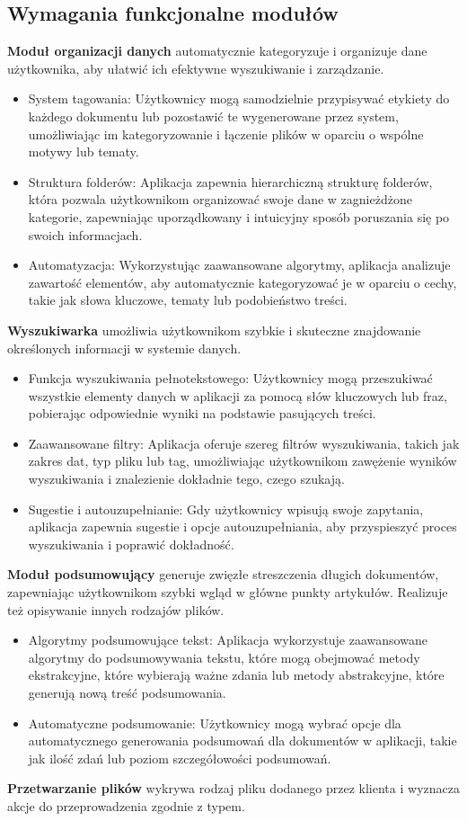 \documentclass[12pt,a4paper,twoside]{article}
\begin{document}
\subsection{Wymagania funkcjonalne modułów}
\textbf{Moduł organizacji danych} automatycznie kategoryzuje i organizuje dane użytkownika, aby ułatwić ich efektywne wyszukiwanie i zarządzanie.
\begin{itemize}
	\item System tagowania: Użytkownicy mogą samodzielnie przypisywać etykiety do każdego dokumentu lub pozostawić te wygenerowane przez system, umożliwiając im kategoryzowanie i łączenie plików w oparciu o wspólne motywy lub tematy.
	\item Struktura folderów: Aplikacja zapewnia hierarchiczną strukturę folderów, która pozwala użytkownikom organizować swoje dane w zagnieżdżone kategorie, zapewniając uporządkowany i intuicyjny sposób poruszania się po swoich informacjach.
	\item Automatyzacja: Wykorzystując zaawansowane algorytmy, aplikacja analizuje zawartość elementów, aby automatycznie kategoryzować je w oparciu o cechy, takie jak słowa kluczowe, tematy lub podobieństwo treści.
\end{itemize}\par
\textbf{Wyszukiwarka} umożliwia użytkownikom szybkie i skuteczne znajdowanie określonych informacji w systemie danych.
\begin{itemize}
	\item Funkcja wyszukiwania pełnotekstowego: Użytkownicy mogą przeszukiwać wszystkie elementy danych w aplikacji za pomocą słów kluczowych lub fraz, pobierając odpowiednie wyniki na podstawie pasujących treści.
	\item Zaawansowane filtry: Aplikacja oferuje szereg filtrów wyszukiwania, takich jak zakres dat, typ pliku lub tag, umożliwiając użytkownikom zawężenie wyników wyszukiwania i znalezienie dokładnie tego, czego szukają.
	\item Sugestie i autouzupełnianie: Gdy użytkownicy wpisują swoje zapytania, aplikacja zapewnia sugestie i opcje autouzupełniania, aby przyspieszyć proces wyszukiwania i poprawić dokładność.
\end{itemize}\par
\textbf{Moduł podsumowujący} generuje zwięzłe streszczenia długich dokumentów, zapewniając użytkownikom szybki wgląd w główne punkty artykułów. Realizuje też opisywanie innych rodzajów plików.
\begin{itemize}
	\item Algorytmy podsumowujące tekst: Aplikacja wykorzystuje zaawansowane algorytmy do podsumowywania tekstu, które mogą obejmować metody ekstrakcyjne, które wybierają ważne zdania lub metody abstrakcyjne, które generują nową treść podsumowania.
	\item Automatyczne podsumowanie: Użytkownicy mogą wybrać opcje dla automatycznego generowania podsumowań dla dokumentów w aplikacji, takie jak ilość zdań lub poziom szczegółowości podsumowań.
\end{itemize}\par
\textbf{Przetwarzanie plików} wykrywa rodzaj pliku dodanego przez klienta i wyznacza akcje do przeprowadzenia zgodnie z typem.
\newpage
\end{document}
